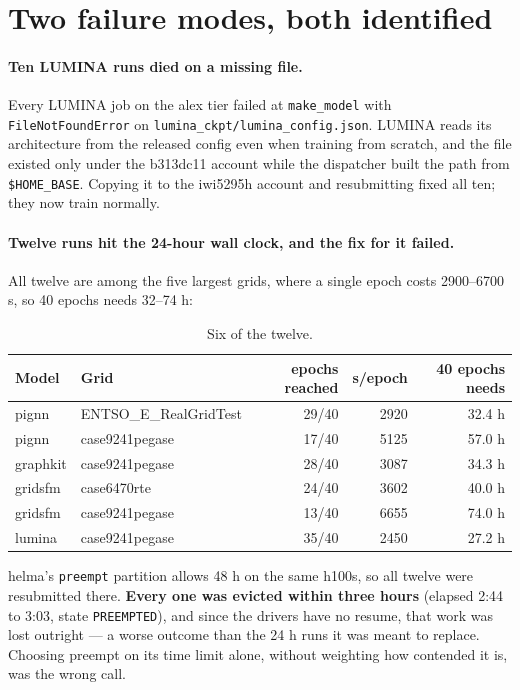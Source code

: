 \documentclass[10pt]{article}
\begin{document}
\section{Two failure modes, both identified}

\paragraph{Ten LUMINA runs died on a missing file.} Every LUMINA job on the alex
tier failed at \texttt{make\_model} with \texttt{FileNotFoundError} on
\texttt{lumina\_ckpt/lumina\_config.json}. LUMINA reads its architecture from
the released config even when training from scratch, and the file existed only
under the b313dc11 account while the dispatcher built the path from
\texttt{\$HOME\_BASE}. Copying it to the iwi5295h account and resubmitting fixed
all ten; they now train normally.

\paragraph{Twelve runs hit the 24-hour wall clock, and the fix for it failed.}
All twelve are among the five largest grids, where a single epoch costs
2900--6700 s, so 40 epochs needs 32--74 h:

\begin{table}[H]
\centering\small
\begin{tabular}{llrrr}
\toprule
Model & Grid & epochs reached & s/epoch & 40 epochs needs \\
\midrule
pignn    & ENTSO\_E\_RealGridTest & 29/40 & 2920 & 32.4 h \\
pignn    & case9241pegase        & 17/40 & 5125 & 57.0 h \\
graphkit & case9241pegase        & 28/40 & 3087 & 34.3 h \\
gridsfm  & case6470rte           & 24/40 & 3602 & 40.0 h \\
gridsfm  & case9241pegase        & 13/40 & 6655 & 74.0 h \\
lumina   & case9241pegase        & 35/40 & 2450 & 27.2 h \\
\bottomrule
\end{tabular}
\caption{Six of the twelve.}
\end{table}

helma's \texttt{preempt} partition allows 48 h on the same h100s, so all twelve
were resubmitted there. \textbf{Every one was evicted within three hours}
(elapsed 2:44 to 3:03, state \texttt{PREEMPTED}), and since the drivers have no
resume, that work was lost outright --- a worse outcome than the 24 h runs it
was meant to replace. Choosing preempt on its time limit alone, without
weighting how contended it is, was the wrong call.
\end{document}
